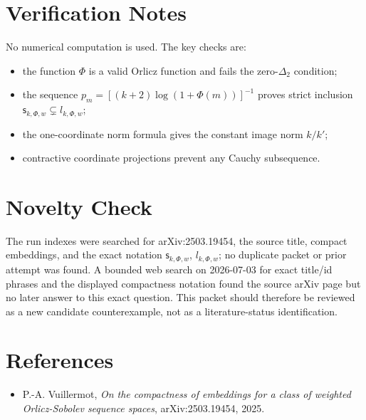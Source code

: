 \documentclass[11pt]{article}
\begin{document}
\section*{Verification Notes}

No numerical computation is used.  The key checks are:
\begin{itemize}
\item the function \(\Phi\) is a valid Orlicz function and fails the
zero-\(\Delta_2\) condition;
\item the sequence \(p_m=[(k+2)\log(1+\Phi(m))]^{-1}\) proves strict
inclusion \(\mathsf{s}_{k,\Phi,w}\subsetneq l_{k,\Phi,w}\);
\item the one-coordinate norm formula gives the constant image norm \(k/k'\);
\item contractive coordinate projections prevent any Cauchy subsequence.
\end{itemize}

\section*{Novelty Check}

The run indexes were searched for arXiv:2503.19454, the source title, compact
embeddings, and the exact notation \(\mathsf{s}_{k,\Phi,w}\),
\(l_{k,\Phi,w}\); no duplicate packet or prior attempt was found.  A bounded
web search on 2026-07-03 for exact title/id phrases and the displayed
compactness notation found the source arXiv page but no later answer to this
exact question.  This packet should therefore be reviewed as a new candidate
counterexample, not as a literature-status identification.

\section*{References}

\begin{itemize}
\item P.-A. Vuillermot, \emph{On the compactness of embeddings for a class of
weighted Orlicz-Sobolev sequence spaces}, arXiv:2503.19454, 2025.
\end{itemize}
\end{document}
